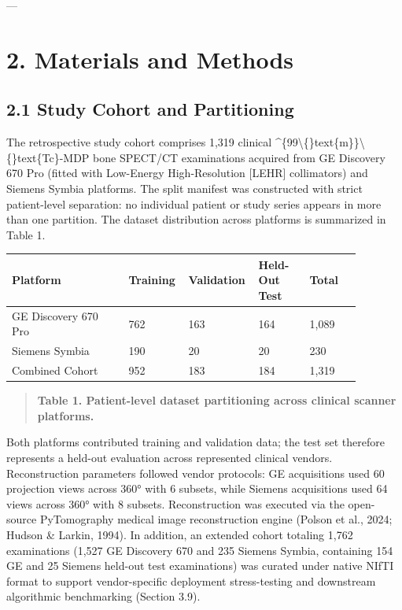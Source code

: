 \documentclass[11pt]{article}
\begin{document}
---\par

\section*{2. Materials and Methods}
\subsection*{2.1 Study Cohort and Partitioning}
The retrospective study cohort comprises 1,319 clinical \textasciicircum{}\{99\textbackslash\{\}text\{m\}\}\textbackslash\{\}text\{Tc\}-MDP bone SPECT/CT examinations acquired from GE Discovery 670 Pro (fitted with Low-Energy High-Resolution [LEHR] collimators) and Siemens Symbia platforms. The split manifest was constructed with strict patient-level separation: no individual patient or study series appears in more than one partition. The dataset distribution across platforms is summarized in Table 1.\par

\begingroup\small\setlength{\tabcolsep}{3pt}\begin{longtable}{p{0.32\linewidth}p{0.14\linewidth}p{0.14\linewidth}p{0.14\linewidth}p{0.14\linewidth}}
\toprule
Platform & Training & Validation & Held-Out Test & Total \\
\midrule
GE Discovery 670 Pro & 762 & 163 & 164 & 1,089 \\
Siemens Symbia & 190 & 20 & 20 & 230 \\
Combined Cohort & 952 & 183 & 184 & 1,319 \\
\bottomrule
\end{longtable}\endgroup
\begin{quote}\small\textbf{Table 1. Patient-level dataset partitioning across clinical scanner platforms.}\end{quote}
Both platforms contributed training and validation data; the test set therefore represents a held-out evaluation across represented clinical vendors. Reconstruction parameters followed vendor protocols: GE acquisitions used 60 projection views across 360° with 6 subsets, while Siemens acquisitions used 64 views across 360° with 8 subsets. Reconstruction was executed via the open-source PyTomography medical image reconstruction engine (Polson et al., 2024; Hudson \& Larkin, 1994). In addition, an extended cohort totaling 1,762 examinations (1,527 GE Discovery 670 and 235 Siemens Symbia, containing 154 GE and 25 Siemens held-out test examinations) was curated under native NIfTI format to support vendor-specific deployment stress-testing and downstream algorithmic benchmarking (Section 3.9).\par
\end{document}
